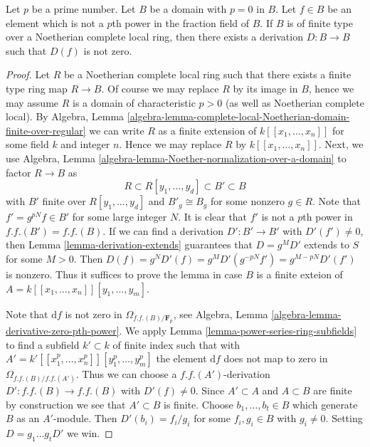 \begin{lemma}
\label{lemma-find-D}
Let $p$ be a prime number. Let $B$ be a domain with $p = 0$ in $B$.
Let $f \in B$ be an element which is not a $p$th power in the fraction
field of $B$. If $B$ is of finite type over a Noetherian complete
local ring, then there exists a derivation $D : B \to B$ such that $D(f)$
is not zero.
\end{lemma}

\begin{proof}
Let $R$ be a Noetherian complete local ring such that there exists
a finite type ring map $R \to B$. Of course we may replace $R$ by
its image in $B$, hence we may assume $R$ is a domain of characteristic
$p > 0$ (as well as Noetherian complete local). By Algebra, Lemma
\ref{algebra-lemma-complete-local-Noetherian-domain-finite-over-regular}
we can write $R$ as a finite extension of $k[[x_1, \ldots, x_n]]$ for some
field $k$ and integer $n$. Hence we may replace $R$ by $k[[x_1, \ldots, x_n]]$.
Next, we use
Algebra, Lemma \ref{algebra-lemma-Noether-normalization-over-a-domain}
to factor $R \to B$ as
$$
R \subset R[y_1, \ldots, y_d] \subset B' \subset B
$$
with $B'$ finite over $R[y_1, \ldots, y_d]$ and $B'_g \cong B_g$
for some nonzero $g \in R$. Note that $f' = g^{pN} f \in B'$ for some
large integer $N$. It is clear that $f'$ is not a $p$th power in
$f.f.(B') = f.f.(B)$. If we can find a derivation
$D' : B' \to B'$ with $D'(f') \not = 0$, then
Lemma \ref{lemma-derivation-extends}
guarantees that $D = g^MD'$ extends to $S$ for some $M > 0$. Then
$D(f) = g^ND'(f) = g^MD'(g^{-pN}f') = g^{M - pN}D'(f')$ is nonzero.
Thus it suffices to prove the lemma in case
$B$ is a finite exteion of $A = k[[x_1, \ldots, x_n]][y_1, \ldots, y_m]$.

\medskip\noindent
Note that $\text{d}f$ is not zero in $\Omega_{f.f.(B)/\mathbf{F}_p}$, see
Algebra, Lemma \ref{algebra-lemma-derivative-zero-pth-power}.
We apply Lemma \ref{lemma-power-series-ring-subfields} to find a subfield
$k' \subset k$ of finite index such that with
$A' = k'[[x_1^p, \ldots, x_n^p]][y_1^p, \ldots, y_m^p]$ the element
$\text{d}f$ does not map to zero in $\Omega_{f.f.(B)/f.f.(A')}$.
Thus we can choose a $f.f.(A')$-derivation $D' : f.f.(B) \to f.f.(B)$
with $D'(f) \not = 0$. Since $A' \subset A$ and $A \subset B$ are
finite by construction we see that $A' \subset B$ is finite.
Choose $b_1, \ldots, b_t \in B$ which generate $B$ as an $A'$-module.
Then $D'(b_i) = f_i/g_i$ for some $f_i, g_i \in B$ with $g_i \not = 0$.
Setting $D = g_1 \ldots g_t D'$ we win.
\end{proof}

